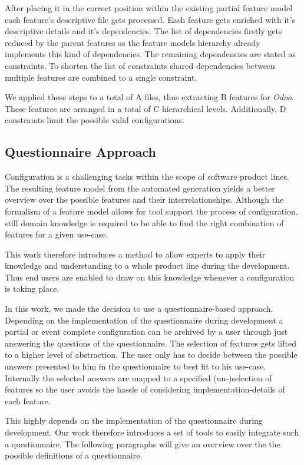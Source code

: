 After placing it in the correct position within the existing partial feature model each feature's descriptive file gets processed. Each feature gets enriched with it's descriptive details and it's dependencies. The list of dependencies firstly gets reduced by the parent features as the feature models hierarchy already implements this kind of dependencies. The remaining dependencies are stated as constraints. To shorten the list of constraints shared dependencies between multiple features are combined to a single constraint.

We applied these steps to a total of A files, thus extracting B features for \textit{Odoo}. These features are arranged in a total of C hierarchical levels. Additionally, D constraints limit the possible valid configurations.

\subsection{Questionnaire Approach}
Configuration is a challenging tasks within the scope of software product lines. The resulting feature model from the automated generation yields a better overview over the possible features and their interrelationships. Although the formalism of a feature model allows for tool support the process of configuration, still domain knowledge is required to be able to find the right combination of features for a given use-case.

This work therefore introduces a method to allow experts to apply their knowledge and understanding to a whole product line during the development. Thus end users are enabled to draw on this knowledge whenever a configuration is taking place.

In this work, we made the decision to use a questionnaire-based approach. Depending on the implementation of the questionnaire during development a partial or event complete configuration can be archived by a user through just answering the questions of the questionnaire. The selection of features gets lifted to a higher level of abstraction. The user only has to decide between the possible answers presented to him in the questionnaire to best fit to his use-case. Internally the selected answers are mapped to a specified (un-)selection of features so the user avoids the hassle of considering implementation-details of each feature.

This highly depends on the implementation of the questionnaire during development. Our work therefore introduces a set of tools to easily integrate such a questionnaire. The following paragraphs will give an overview over the the possible definitions of a questionnaire.

